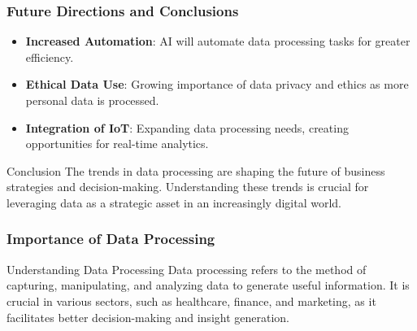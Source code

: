 \documentclass[aspectratio=169]{beamer}
\begin{document}
\begin{frame}[fragile]
    \frametitle{Future Directions and Conclusions}
    \begin{itemize}
        \item \textbf{Increased Automation}: AI will automate data processing tasks for greater efficiency.
        \item \textbf{Ethical Data Use}: Growing importance of data privacy and ethics as more personal data is processed.
        \item \textbf{Integration of IoT}: Expanding data processing needs, creating opportunities for real-time analytics.
    \end{itemize}
    \begin{block}{Conclusion}
        The trends in data processing are shaping the future of business strategies and decision-making. Understanding these trends is crucial for leveraging data as a strategic asset in an increasingly digital world.
    \end{block}
\end{frame}

\begin{frame}[fragile]
    \frametitle{Importance of Data Processing}
    \begin{block}{Understanding Data Processing}
        Data processing refers to the method of capturing, manipulating, and analyzing data to generate useful information. It is crucial in various sectors, such as healthcare, finance, and marketing, as it facilitates better decision-making and insight generation.
    \end{block}
\end{frame}
\end{document}
